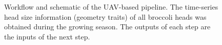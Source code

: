 \begin{figure}[htb]
  \begin{center}
  \end{center}
  \caption[Workflow and schematic of the UAV-based pipeline]{
    Workflow and schematic of the UAV-based pipeline. The time-series head size information (geometry traits) of all broccoli heads was obtained during the growing season. The outputs of each step are the inputs of the next step.
  }
  \label{fig:bro4}
\end{figure}